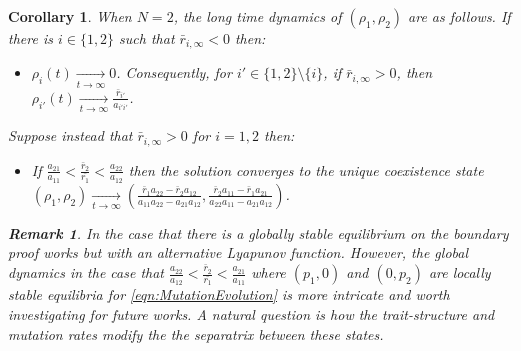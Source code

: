 \documentclass{article}
\newtheorem{rmk}{Remark}[section]
\newtheorem{corollary}{Corollary}[section]
\begin{document}
\begin{corollary}
When $N=2$, the long time dynamics of $(\rho_1,\rho_2)$ are as follows.
If there is $i\in\{1,2\}$ such that $\bar{r}_{i,\infty}<0$ then:
\begin{itemize}

    \item  $\rho_i(t)\xrightarrow[t\rightarrow\infty]{}0$. Consequently, for $i'\in\{1,2\}\setminus\{i\}$, if $\bar{r}_{i,\infty}>0$, then $\rho_{i'}(t)\xrightarrow[t\rightarrow\infty]{}\frac{\bar{r}_{i'}}{a_{i'i'}}$. 
    \end{itemize}
Suppose instead that $\bar{r}_{i,\infty}>0$ for $i=1,2$ then:
\begin{itemize}
    \item  If $\frac{a_{21}}{a_{11}}<\frac{\bar{r}_2}{\bar{r_1}}<\frac{a_{22}}{a_{12}}$
    then the solution converges to the unique coexistence state $(\rho_1,\rho_2)\xrightarrow[t\rightarrow\infty]{}\left(\frac{\bar{r}_1a_{22}-\bar{r}_2a_{12}}{a_{11}a_{22}-a_{21}a_{12}},\frac{\bar{r}_2a_{11}-\bar{r}_1a_{21}}{a_{22}a_{11}-a_{21}a_{12}}\right)$.

\end{itemize}

\begin{rmk}
    In the case that there is a globally stable equilibrium on the boundary proof works but with an alternative Lyapunov function. However, the global dynamics in the case that   $\frac{a_{22}}{a_{12}}<\frac{\bar{r}_2}{\bar{r_1}}<\frac{a_{21}}{a_{11}}$ where $(p_1,0)$ and $(0,p_2)$ are locally stable equilibria for \eqref{eqn:MutationEvolution} is more intricate and worth investigating for future works. A natural question is how the trait-structure and mutation rates modify the the separatrix between these states. 
    
\end{rmk}
   
\end{corollary}
\end{document}
